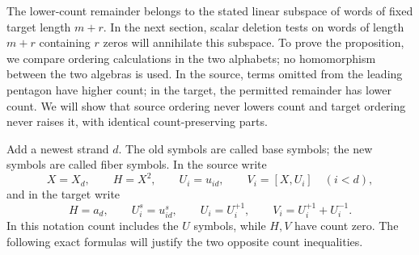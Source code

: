 \documentclass[11pt]{article}
\theoremstyle{definition}
\theoremstyle{remark}
\numberwithin{equation}{section}
\begin{document}
The lower-count remainder belongs to the stated linear subspace of
words of fixed target length $m+r$.  In the next section, scalar deletion
tests on words of length $m+r$ containing $r$ zeros will annihilate
this subspace.
To prove the proposition, we compare
ordering calculations in the two alphabets; no homomorphism between
the two algebras is used.  In the source, terms omitted from the leading
pentagon have higher count; in the target, the permitted remainder has
lower count.  We will show that source ordering never lowers count and
target ordering never raises it, with identical count-preserving parts.

Add a newest strand $d$.  The old symbols
are called base symbols; the new symbols are called fiber symbols.
In the source write
\[
 X=X_d,\qquad H=X^2,\qquad
 U_i=u_{id},\qquad V_i=[X,U_i]\quad(i<d),
\]
and in the target write
\[
 H=a_d,\qquad U_i^s=u_{id}^s,\qquad
 U_i=U_i^{+1},\qquad V_i=U_i^{+1}+U_i^{-1}.
\]
In this notation count includes the $U$ symbols, while $H,V$ have
count zero.  The following exact formulas will justify the two
opposite count inequalities.
\end{document}
